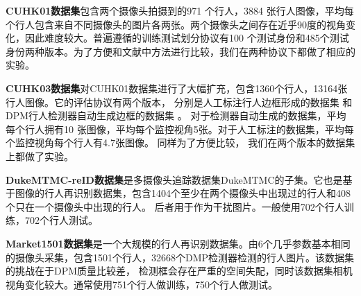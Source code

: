 \textbf{CUHK01数据集}包含两个摄像头拍摄到的971 个行人，3884 张行人图像，平均每个行人包含来自不同摄像头的图片各两张。两个摄像头之间存在近乎90度的视角变化，因此难度较大。普遍遵循的训练测试划分协议有100 个测试身份和485个测试身份两种版本。为了方便和文献中方法进行比较，我们在两种协议下都做了相应的实验。

\textbf{CUHK03数据集}对CUHK01数据集进行了大幅扩充，包含1360个行人，13164张行人图像。它的评估协议有两个版本，
分别是人工标注行人边框形成的数据集
和DPM行人检测器自动生成边框的数据集
。
对于检测器自动生成的数据集，平均每个行人拥有10 张图像，平均每个监控视角5张。对于人工标注的数据集，平均每个监控视角每个行人有4.7张图像。
同样为了方便比较，
我们在两个版本的数据集上都做了实验。





\textbf{DukeMTMC-reID数据集}是多摄像头追踪数据集DukeMTMC的子集。它也是基于图像的行人再识别数据集，包含1404个至少在两个摄像头中出现过的行人和408个只在一个摄像头中出现的行人。
后者用于作为干扰图片。一般使用702个行人训练，702个行人测试。

\textbf{Market1501数据集}是一个大规模的行人再识别数据集。由6个几乎参数基本相同的摄像头采集，包含1501个行人，32668个DMP检测器检测的行人图片。该数据集的挑战在于DPM质量比较差，
检测框会存在严重的空间失配，同时该数据集相机视角变化较大。通常使用751个行人做训练，750个行人做测试。

